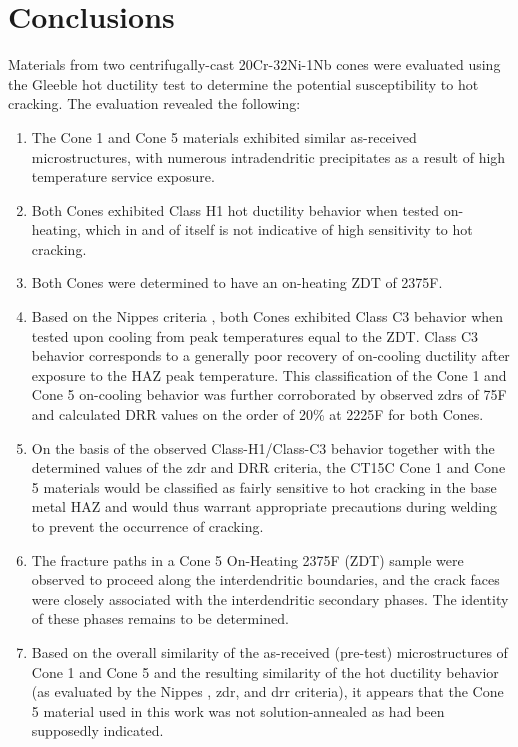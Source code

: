 \chapter{Conclusions} \label{ch:conclusions}
Materials from two centrifugally-cast 20Cr-32Ni-1Nb cones were evaluated using the Gleeble hot ductility test to determine the potential susceptibility to hot cracking.  The evaluation revealed the following:

\begin{enumerate}
\item The Cone 1 and Cone 5 materials exhibited similar as-received microstructures, with numerous intradendritic precipitates as a result of high temperature service exposure.
\item Both Cones exhibited Class H1 hot ductility behavior when tested on-heating, which in and of itself is not indicative of high sensitivity to hot cracking.
\item Both Cones were determined to have an on-heating ZDT of 2375\textdegree{}F.
\item Based on the Nippes criteria \cite{nippes_further_1957}, both Cones exhibited Class C3 behavior when tested upon cooling from peak temperatures equal to the ZDT.  Class C3 behavior corresponds to a generally poor recovery of on-cooling ductility after exposure to the HAZ peak temperature.  This classification of the Cone 1 and Cone 5 on-cooling behavior was further corroborated by observed \gls{zdr}s of 75F\textdegree{} and calculated DRR values on the order of 20\% at 2225\textdegree{}F for both Cones.
\item On the basis of the observed Class-H1/Class-C3 behavior together with the determined values of the \gls{zdr} and DRR criteria, the CT15C Cone 1 and Cone 5 materials would be classified as fairly sensitive to hot cracking in the base metal HAZ and would thus warrant appropriate precautions during welding to prevent the occurrence of cracking.
\item The fracture paths in a Cone 5 On-Heating 2375\textdegree{}F (ZDT) sample were observed to proceed along the interdendritic boundaries, and the crack faces were closely associated with the interdendritic secondary phases.  The identity of these phases remains to be determined.
\item Based on the overall similarity of the as-received (pre-test) microstructures of Cone 1 and Cone 5 and the resulting similarity of the hot ductility behavior (as evaluated by the Nippes \cite{nippes_further_1957}, \gls{zdr}, and \gls{drr} criteria), it appears that the Cone 5 material used in this work was not solution-annealed as had been supposedly indicated.
\end{enumerate}



